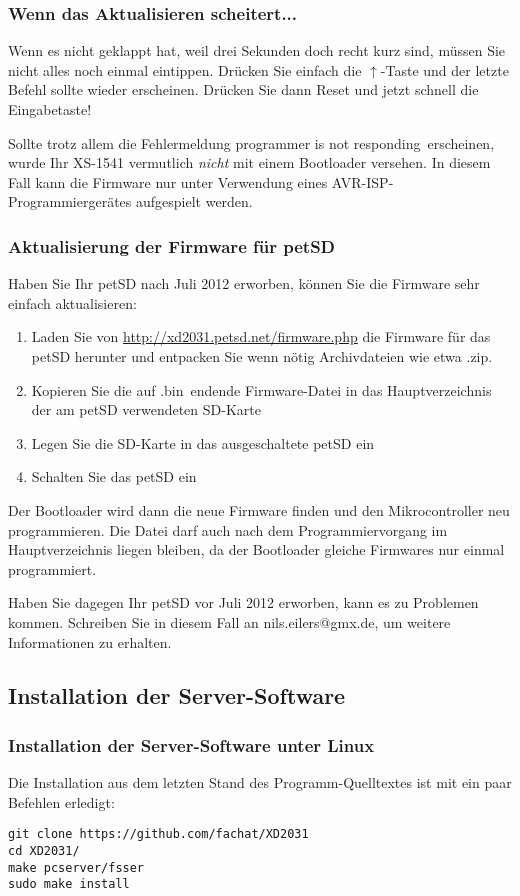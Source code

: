 \documentclass[10pt,a4paper]{scrartcl}		%
\newcommand{\fwbinaries}{\url{http://xd2031.petsd.net/firmware.php}}
\begin{document}
\subsubsection*{Wenn das Aktualisieren scheitert...}
Wenn es nicht geklappt hat, weil drei Sekunden doch recht kurz sind,
müssen Sie nicht alles noch einmal eintippen. Drücken Sie einfach
die $\uparrow$-Taste und der letzte Befehl sollte
wieder erscheinen. Drücken Sie dann Reset und jetzt schnell die Eingabetaste!

Sollte trotz allem die Fehlermeldung \glqq programmer is not responding\grqq\ 
erscheinen, wurde Ihr XS-1541 vermutlich \textit{nicht} mit einem Bootloader
versehen. In diesem Fall kann die Firmware nur unter Verwendung eines
AVR-ISP-Programmiergerätes aufgespielt werden.

\subsubsection{Aktualisierung der Firmware für petSD}
\label{petsdfwinst}
Haben Sie Ihr petSD nach Juli 2012 erworben, können Sie die Firmware
sehr einfach aktualisieren:
\begin{enumerate}
\item Laden Sie von \fwbinaries{} die Firmware für das \mbox{petSD}
herunter und entpacken Sie wenn nötig Archivdateien wie etwa \glqq .zip\grqq . 
\item Kopieren Sie die auf \glqq .bin\grqq\ endende Firmware-Datei
in das Hauptverzeichnis der am petSD verwendeten SD-Karte
\item Legen Sie die SD-Karte in das ausgeschaltete petSD ein
\item Schalten Sie das petSD ein
\end{enumerate}
Der Bootloader wird dann die neue Firmware finden und den Mikrocontroller
neu programmieren. Die Datei darf auch nach dem Programmiervorgang im 
Hauptverzeichnis liegen bleiben, da der Bootloader gleiche Firmwares
nur einmal programmiert.

Haben Sie dagegen Ihr petSD vor Juli 2012 erworben, kann es zu
Problemen kommen. Schreiben Sie in diesem Fall an nils.eilers@gmx.de, 
um weitere Informationen zu erhalten.

\subsection{Installation der Server-Software}
\label{serverinst}
\subsubsection{Installation der Server-Software unter Linux}
Die Installation aus dem letzten Stand des Programm-Quelltextes
ist mit ein paar Befehlen erledigt:
\lstset{language=,}
\begin{lstlisting}
git clone https://github.com/fachat/XD2031
cd XD2031/
make pcserver/fsser
sudo make install
\end{lstlisting}
\end{document}
